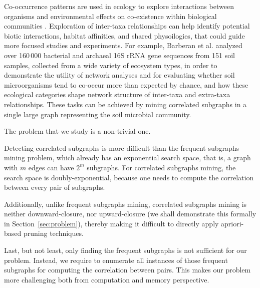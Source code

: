 Co-occurrence patterns are used in ecology to explore interactions between organisms
and environmental effects on co-existence within biological communities \cite{WHH14}.
Exploration of inter-taxa relationships can help identify potential biotic interactions, habitat affinities, and shared physoilogies,
that could guide more focused studies and experiments. For example, Barberan et al. \cite{BBCF12} analyzed
over 160\,000 bacterial and archaeal 16S rRNA gene sequences from 151 soil samples, collected
from a wide variety of ecosystem types, in order to demonstrate the utility of network
analyses and for evaluating whether soil microorganisms tend to co-occur more
than expected by chance, and how these
ecological categories shape network structure of inter-taxa and extra-taxa relationships.
These tasks can be achieved by mining correlated subgraphs in a single large graph
representing the soil microbial community.

The problem that we study is a non-trivial one.
%
\squishlist
\item Detecting correlated subgraphs is more difficult
than the frequent subgraphs mining problem, which already has an exponential search space, that is, a graph with $m$ edges
can have $2^m$ subgraphs. For correlated subgraphs mining, the search space is doubly-exponential, because
one needs to compute the correlation between every pair of subgraphs.
\item Additionally, unlike frequent subgraphs mining,
correlated subgraphs mining is neither downward-closure, nor upward-closure (we shall demonstrate this formally
in Section~\ref{sec:problem}), thereby making it difficult to directly apply apriori-based pruning techniques.
\item Last, but not least, only finding the frequent subgraphs is not sufficient for our problem.
Instead, we require to enumerate all instances of those frequent subgraphs for computing the correlation
between pairs. This makes our problem more challenging both from computation and memory perspective.
\squishend


